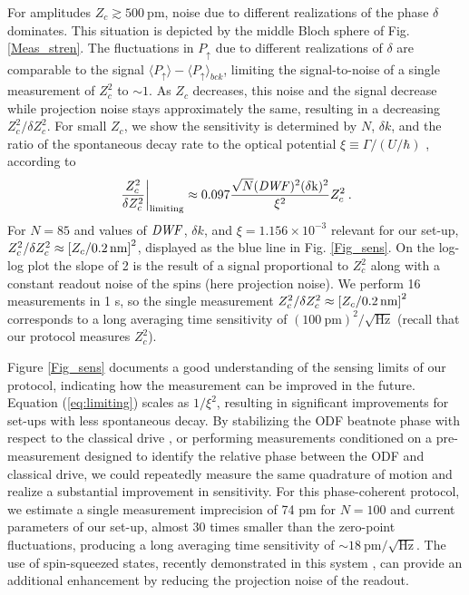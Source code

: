 \documentclass[aps,prl,twocolumn,superscriptaddress,floatfix]{revtex4-1}
\begin{document}
For amplitudes $Z_{c}\gtrsim 500\:\mathrm{pm}$, noise due to different realizations of the phase $\delta$ dominates. This situation is depicted by the middle Bloch sphere of Fig. \ref{Meas_stren}. The fluctuations in $P_{\uparrow}$ due to different realizations of $\delta$ are comparable to the signal $\langle P_{\uparrow}\rangle - \langle P_{\uparrow} \rangle_{bck}$, limiting the signal-to-noise of a single measurement of $Z_{c}^{2}$
to ${\sim} 1$. As $Z_{c}$ decreases, this noise and the signal
decrease while projection noise stays approximately the same, resulting
in a decreasing $Z_{c}^{2}/\delta Z_{c}^{2}$. For small $Z_c$, we show the sensitivity is determined by $N$, $\delta k$, and the ratio of the spontaneous decay rate to the optical potential $\xi\equiv\Gamma/\left(U/\hbar\right)$ \citep{SuppMat}, according to
\begin{equation}
\left.\frac{Z_{c}^{2}}{\delta Z_{c}^{2}}\right|_{\mathrm{limiting}}\approx 0.097 \frac{\sqrt{N}(\rm{\it{DWF}})^2 (\delta k)^2}{\xi^2} Z_c^2\:.\label{eq:limiting}
\end{equation}
For $N=85$  and values of $\rm{\it{DWF}}$, $\delta k$, and $\xi=1.156\times10^{-3}$ relevant for our set-up, $Z_c^2/\delta Z_c^2 \approx \left[ Z_c/ 0.2 \, \rm{nm} \right]^2$, displayed as the blue line in Fig. \ref{Fig_sens}. On the log-log plot the slope of 2 is the result of a signal proportional to $Z_c^2$ along with a constant readout noise of the spins (here projection noise). We perform 16 measurements in 1 s, so the single measurement ${Z_{c}^{2}}/{\delta Z_{c}^{2}} \approx \left[ Z_c/ 0.2 \, \rm{nm} \right]^2$ corresponds to a long averaging time sensitivity of $\left(100\:\mathrm{pm}\right)^{2}/\sqrt{\mathrm{Hz}}$ (recall that our protocol measures $Z_{c}^2$).

Figure \ref{Fig_sens} documents a good understanding of the sensing limits
of our protocol, indicating how the measurement can be improved in the future.
Equation (\ref{eq:limiting}) scales as $1/\xi^{2}$, resulting in
significant improvements for set-ups with less spontaneous decay. By stabilizing the ODF beatnote phase with respect to the classical drive \citep{Hume2011, Biercuk2011}, or performing measurements conditioned on a pre-measurement designed to identify the relative phase between the ODF and classical drive, we could repeatedly measure the same quadrature of motion and realize a substantial improvement in sensitivity. 
For this phase-coherent protocol, we estimate \citep{SuppMat} a single measurement imprecision of 74 pm for $N=100$ and current parameters of our set-up, almost 30 times
smaller than the zero-point fluctuations, producing a long averaging time sensitivity of ${\sim}18\:\mathrm{pm/\sqrt{\mathrm{Hz}}}$. The use of spin-squeezed states, recently demonstrated in this system \citep{Bohnet2015}, can provide an additional enhancement by reducing the projection noise of the readout.
\end{document}
